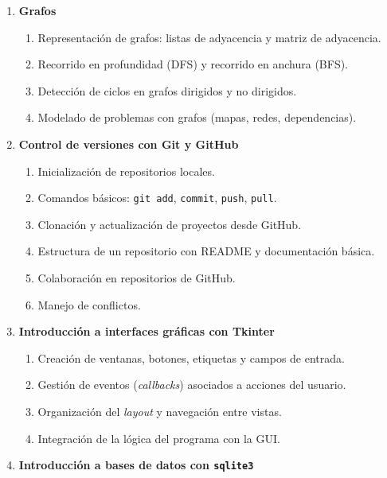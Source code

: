 \begin{enumerate}
  \item \textbf{Grafos}

  \begin{enumerate}
    \item \label{itm:4.1} Representación de grafos: listas de adyacencia y matriz de adyacencia.
    \item \label{itm:4.2} Recorrido en profundidad (DFS) y recorrido en anchura (BFS).
    \item \label{itm:4.3} Detección de ciclos en grafos dirigidos y no dirigidos.
    \item \label{itm:4.4} Modelado de problemas con grafos (mapas, redes, dependencias).
  \end{enumerate}

  \item \textbf{Control de versiones con Git y GitHub}

  \begin{enumerate}
    \item \label{itm:5.1} Inicialización de repositorios locales.
    \item \label{itm:5.2} Comandos básicos: \texttt{git add}, \texttt{commit}, \texttt{push}, \texttt{pull}.
    \item \label{itm:5.3} Clonación y actualización de proyectos desde GitHub.
    \item \label{itm:5.4} Estructura de un repositorio con README y documentación básica.
    \item \label{itm:5.5} Colaboración en repositorios de GitHub.
    \item \label{itm:5.6} Manejo de conflictos.
  \end{enumerate}

  \item \textbf{Introducción a interfaces gráficas con Tkinter}

  \begin{enumerate}
    \item \label{itm:6.1} Creación de ventanas, botones, etiquetas y campos de entrada.
    \item \label{itm:6.2} Gestión de eventos (\textit{callbacks}) asociados a acciones del usuario.
    \item \label{itm:6.3} Organización del \textit{layout} y navegación entre vistas.
    \item \label{itm:6.4} Integración de la lógica del programa con la GUI.
  \end{enumerate}

  \item \textbf{Introducción a bases de datos con \texttt{sqlite3}}


\end{enumerate}
